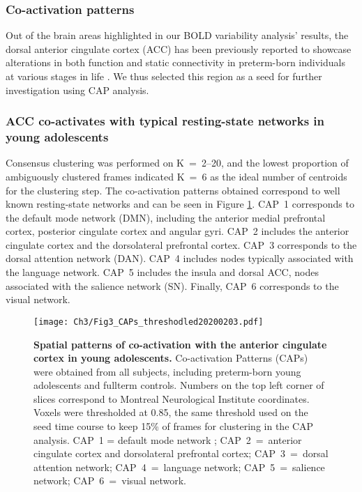 \subsubsection{Co-activation patterns}

Out of the brain areas highlighted in our BOLD variability analysis' results, the dorsal anterior cingulate cortex (ACC) has been previously reported to showcase alterations in both function and static connectivity in preterm-born individuals at various stages in life \citep{White2014,Daamen2015,Lordier2019}. We thus selected this region as a seed for further investigation using CAP analysis. 

\subsubsection*{ACC co-activates with typical resting-state networks in young adolescents} Consensus clustering was performed on K~=~2--20, and the lowest proportion of ambiguously clustered frames indicated K~=~6 as the ideal number of centroids for the clustering step. The co-activation patterns obtained correspond to well known resting-state networks and can be seen in Figure \ref{fig:CAPs}. CAP~1 corresponds to the default mode network (DMN), including the anterior medial prefrontal cortex, posterior cingulate cortex and angular gyri. CAP~2 includes the anterior cingulate cortex and the dorsolateral prefrontal cortex. CAP~3 corresponds to the dorsal attention network (DAN). CAP~4 includes nodes typically associated with the language network. CAP~5 includes the insula and dorsal ACC, nodes associated with the salience network (SN). Finally, CAP~6 corresponds to the visual network.


\begin{figure}[h]
\centering\texttt{[image: Ch3/Fig3\_CAPs\_threshodled20200203.pdf]}
\caption{\textbf{Spatial patterns of co-activation with the anterior cingulate cortex in young adolescents.} Co-activation Patterns (CAPs) were obtained from all subjects, including preterm-born young adolescents and fullterm controls. Numbers on the top left corner of slices correspond to Montreal Neurological Institute coordinates. Voxels were thresholded at 0.85, the same threshold used on the seed time course to keep 15\% of frames for clustering in the CAP analysis.  CAP~1 = default mode network ; CAP~2~=~anterior cingulate cortex and dorsolateral prefrontal cortex; CAP~3~=~dorsal attention network; CAP~4~=~language network; CAP~5~=~salience network; CAP~6~=~visual network.} \label{fig:CAPs}
\end{figure}





